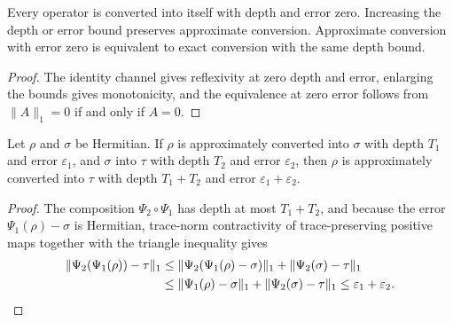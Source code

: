 \begin{lemma}
    \label{thm:qc_approx_conversion_properties}
    \leanok
    Every operator is converted into itself with depth and error zero.
    Increasing the depth or error bound preserves approximate conversion.
    Approximate conversion with error zero is equivalent to exact conversion
    with the same depth bound.
\end{lemma}
\begin{proof}
    \leanok
    The identity channel gives reflexivity at zero depth and error, enlarging
    the bounds gives monotonicity, and the equivalence at zero error follows
    from $\lVert A\rVert_1=0$ if and only if $A=0$.
\end{proof}

\begin{lemma}
    \label{thm:qc_approx_conversion_trans}
    \leanok
    Let $\rho$ and $\sigma$ be Hermitian. If $\rho$ is approximately converted
    into $\sigma$ with depth $T_1$ and error $\varepsilon_1$, and $\sigma$ into
    $\tau$ with depth $T_2$ and error $\varepsilon_2$, then $\rho$ is
    approximately converted into $\tau$ with depth $T_1+T_2$ and error
    $\varepsilon_1+\varepsilon_2$.
\end{lemma}
\begin{proof}
    \leanok
    The composition $\Psi_2\circ\Psi_1$ has depth at most $T_1+T_2$, and
    because the error $\Psi_1(\rho)-\sigma$ is Hermitian, trace-norm
    contractivity of trace-preserving positive maps together with the
    triangle inequality gives
    \begin{align}
        \lVert\Psi_2(\Psi_1(\rho))-\tau\rVert_1
         & \le \lVert\Psi_2(\Psi_1(\rho)-\sigma)\rVert_1
        +\lVert\Psi_2(\sigma)-\tau\rVert_1 \notag        \\
         & \le \lVert\Psi_1(\rho)-\sigma\rVert_1
        +\lVert\Psi_2(\sigma)-\tau\rVert_1
        \le\varepsilon_1+\varepsilon_2. \notag
    \end{align}
\end{proof}

